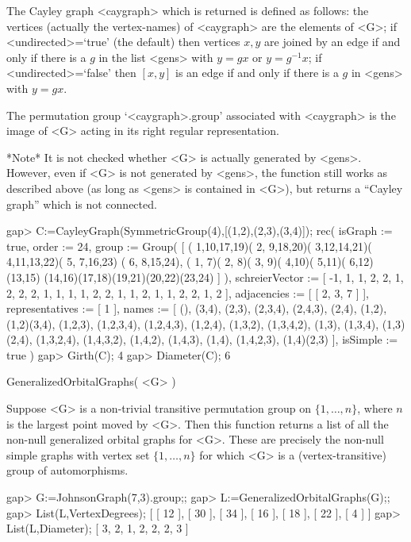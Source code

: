 The Cayley graph  <caygraph>  which is returned is defined as follows:
the vertices (actually the vertex-names) of <caygraph>  are the elements
of <G>;  if <undirected>=`true' (the default) then vertices $x,y$ are
joined by an edge if and only if there is a $g$ in the list <gens> with
$y=gx$ or $y=g^{-1}x$; if <undirected>=`false' then $[x,y]$ is an edge
if and only if there is a $g$ in <gens> with $y=gx$.

The permutation group `<caygraph>.group' associated with <caygraph> is
the image of <G> acting in its right regular representation.

*Note* It is not checked whether <G> is actually generated by <gens>.
However, even if <G> is not generated by <gens>, the function still
works as described above (as long as <gens> is contained in <G>), but
returns a ``Cayley graph'' which is not connected.

\beginexample
gap> C:=CayleyGraph(SymmetricGroup(4),[(1,2),(2,3),(3,4)]);
rec(
  isGraph := true,
  order := 24,
  group :=
   Group( [ ( 1,10,17,19)( 2, 9,18,20)( 3,12,14,21)( 4,11,13,22)( 5, 7,16,23)
        ( 6, 8,15,24), ( 1, 7)( 2, 8)( 3, 9)( 4,10)( 5,11)( 6,12)(13,15)
        (14,16)(17,18)(19,21)(20,22)(23,24) ] ),
  schreierVector := [ -1, 1, 1, 2, 2, 1, 2, 2, 2, 1, 1, 1, 1, 2, 2, 1, 1, 2,
      1, 1, 2, 2, 1, 2 ],
  adjacencies := [ [ 2, 3, 7 ] ],
  representatives := [ 1 ],
  names := [ (), (3,4), (2,3), (2,3,4), (2,4,3), (2,4), (1,2), (1,2)(3,4),
      (1,2,3), (1,2,3,4), (1,2,4,3), (1,2,4), (1,3,2), (1,3,4,2), (1,3),
      (1,3,4), (1,3)(2,4), (1,3,2,4), (1,4,3,2), (1,4,2), (1,4,3), (1,4),
      (1,4,2,3), (1,4)(2,3) ],
  isSimple := true )
gap> Girth(C);
4
gap> Diameter(C);
6
\endexample


\>GeneralizedOrbitalGraphs( <G> )

Suppose <G> is a non-trivial transitive permutation group
on $\{1,\ldots,n\}$, where $n$ is the largest point moved by <G>.
Then this function returns a list of all the non-null generalized
orbital graphs for <G>. These are precisely the non-null simple graphs
with vertex set $\{1,\ldots,n\}$ for which <G> is a (vertex-transitive)
group of automorphisms.

\beginexample
gap> G:=JohnsonGraph(7,3).group;;    
gap> L:=GeneralizedOrbitalGraphs(G);;
gap> List(L,VertexDegrees);   
[ [ 12 ], [ 30 ], [ 34 ], [ 16 ], [ 18 ], [ 22 ], [ 4 ] ]
gap> List(L,Diameter);
[ 3, 2, 1, 2, 2, 2, 3 ]
\endexample

